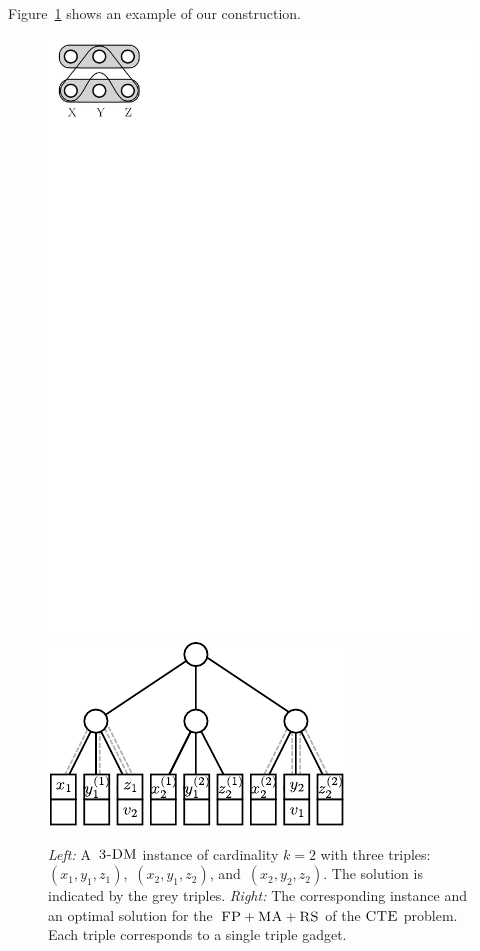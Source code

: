 Figure~\ref{fig:fprsma} shows an example of our construction.

\begin{figure}[t]
  \centering
\includegraphics[width = 0.21\columnwidth]{figs/static-mapping/tdm-horizontal}
\hspace{1cm}
\centering
\includegraphics[width = 0.4\columnwidth]{figs/static-mapping/np_3dm_construction}
\hfill
\caption{\textit{Left:} A~$\textsc{3-DM}$ instance of cardinality $k=2$ with three triples:
$(x_1, y_1, z_1)$,~$(x_2, y_1, z_2)$, and~$(x_2, y_2, z_2)$. The solution is
indicated by the grey triples. \textit{Right:} The corresponding instance and an optimal solution for the~$\textsc{FP} + \textsc{MA}
+ \textsc{RS}$ of the $\textsc{CTE}$ problem. Each triple corresponds to a single triple gadget.}
\hfill
\label{fig:fprsma}
\end{figure}


